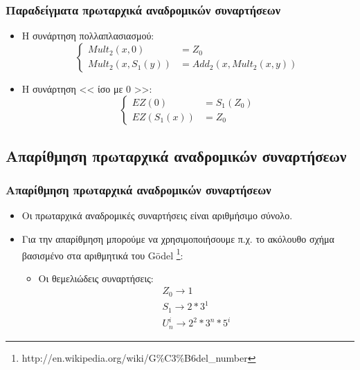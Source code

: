 \documentclass{beamer}
\begin{document}
\begin{frame}
        \frametitle{Παραδείγματα πρωταρχικά αναδρομικών συναρτήσεων}
        \begin{itemize}
                \item Η συνάρτηση πολλαπλασιασμού:
                \[
                        \left\{
                                \begin{array}{ll}
                                        Mult_2(x, 0) &= Z_0\\
                                        Mult_2(x, S_1(y)) &= Add_2(x, Mult_2(x, y))
                                \end{array}
                        \right.
                \]
                \pause
                \item Η συνάρτηση << ίσο με 0 >>:
                \[
                        \left\{
                                \begin{array}{ll}
                                        EZ(0) &= S_1(Z_0)\\
                                        EZ(S_1(x)) &= Z_0
                                \end{array}
                        \right.
                \]
        \end{itemize}
\end{frame}

\subsection{Απαρίθμηση πρωταρχικά αναδρομικών συναρτήσεων}

\begin{frame}
        \frametitle{Απαρίθμηση πρωταρχικά αναδρομικών συναρτήσεων}
        \begin{itemize}
                \item Οι πρωταρχικά αναδρομικές συναρτήσεις είναι αριθμήσιμο σύνολο.
                \pause
                \item Για την απαρίθμηση μπορούμε να χρησιμοποιήσουμε π.χ. το 
                ακόλουθο σχήμα βασισμένο στα αριθμητικά του G\"odel
                \footnote{
                {http://en.wikipedia.org/wiki/G\%C3\%B6del_number}}:
                \begin{itemize}
                        \item Οι θεμελιώδεις συναρτήσεις:
                        \[
                                \begin{array}{l}
                                        Z_0 \rightarrow 1 \\
                                        S_1 \rightarrow 2*3^1 \\
                                        U^i_n \rightarrow 2^2*3^n*5^i
                                \end{array}
                        \]
                \end{itemize}
        \end{itemize}
\end{frame}
\end{document}

